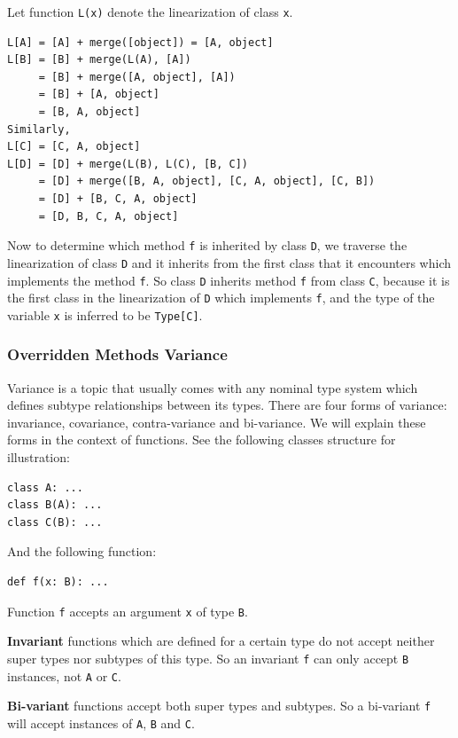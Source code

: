Let function \lstinline|L(x)| denote the linearization of class \lstinline|x|.
\begin{lstlisting}
L[A] = [A] + merge([object]) = [A, object]
L[B] = [B] + merge(L(A), [A])
     = [B] + merge([A, object], [A])
     = [B] + [A, object]
     = [B, A, object]
Similarly,
L[C] = [C, A, object]
L[D] = [D] + merge(L(B), L(C), [B, C])
     = [D] + merge([B, A, object], [C, A, object], [C, B])
     = [D] + [B, C, A, object]
     = [D, B, C, A, object]
\end{lstlisting}

Now to determine which method \lstinline|f| is inherited by class \lstinline|D|, we traverse the linearization of class \lstinline|D| and it inherits from the first class that it encounters which implements the method \lstinline|f|. So class \lstinline|D| inherits method \lstinline|f| from class \lstinline|C|, because it is the first class in the linearization of \lstinline|D| which implements \lstinline|f|, and the type of the variable \lstinline|x| is inferred to be \lstinline|Type[C]|.

\subsubsection{Overridden Methods Variance}
Variance is a topic that usually comes with any nominal type system which defines subtype relationships between its types. There are four forms of variance: invariance, covariance, contra-variance and bi-variance. We will explain these forms in the context of functions. See the following classes structure for illustration:
\begin{lstlisting}
class A: ...
class B(A): ...
class C(B): ...
\end{lstlisting}

And the following function:
\begin{lstlisting}
def f(x: B): ...
\end{lstlisting}

Function \lstinline|f| accepts an argument \lstinline|x| of type \lstinline|B|.

\textbf{Invariant} functions which are defined for a certain type do not accept neither super types nor subtypes of this type. So an invariant \lstinline|f| can only accept \lstinline|B| instances, not \lstinline|A| or \lstinline|C|.

\textbf{Bi-variant} functions accept both super types and subtypes. So a bi-variant \lstinline|f| will accept instances of \lstinline|A|, \lstinline|B| and \lstinline|C|.

